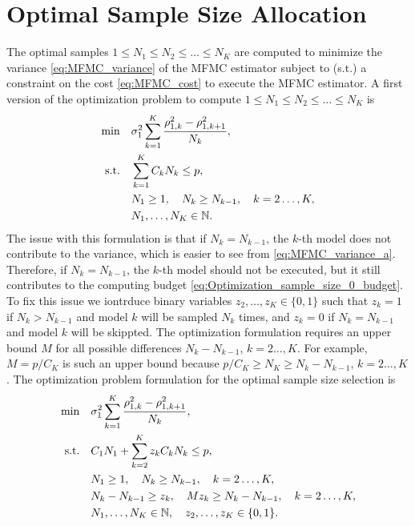 \section{Optimal Sample Size Allocation}\label{sec:MFMC_Nk_optimize}
The optimal samples $1 \le N_1 \le N_2 \le \ldots \le N_K$ are computed to minimize
the variance \eqref{eq:MFMC_variance} of the MFMC estimator
subject to (s.t.) a constraint on the cost \eqref{eq:MFMC_cost} to execute the MFMC estimator.
A first version of the optimization problem to compute $1 \le N_1 \le N_2 \le \ldots \le N_K$ is
\begin{subequations}\label{eq:Optimization_sample_size_N}
    \begin{align}
    \min \quad &\sigma_1^2  \sum_{k=1}^K \frac{ \rho_{1,k}^2 - \rho_{1,k+1}^2}{N_k},   \\
       \text{s.t.}\quad & \sum_{k=1}^K C_kN_k \le p,       \label{eq:Optimization_sample_size_N_budget}  \\
                                & N_1\ge 1,\quad  N_k \ge N_{k-1}, \quad k=2\ldots,K,\\
                                &N_1,\ldots, N_K\in \mathbb{N}.
    \end{align}
\end{subequations}
The issue with this formulation is that if $N_k = N_{k-1}$, the $k$-th model
does not contribute to the variance, which is easier to see from \eqref{eq:MFMC_variance_a}.
Therefore, if $N_k = N_{k-1}$, the $k$-th model should not be executed, but it still contributes to
the computing budget \eqref{eq:Optimization_sample_size_0_budget}.
To fix this issue we iontrduce binary variables $z_2, \ldots, z_K \in \{0,1\}$ such that
$z_k = 1$ if $N_k > N_{k-1}$ and model $k$ will be sampled $N_k$ times, and 
$z_k = 0$ if $N_k = N_{k-1}$ and model $k$ will be skippted.
The optimization formulation requires 
an upper bound $M$ for all possible differences $N_k - N_{k-1}$, $k=2\ldots,K$.
For example, $M = p/ C_K$ is such an upper bound because  $p/ C_K \ge N_K \ge N_k - N_{k-1}$, $k=2\ldots,K$.
The optimization problem formulation for the optimal sample size selection is
\begin{subequations}\label{eq:Optimization_sample_size_Nz}
    \begin{align}
    \min \quad &\sigma_1^2  \sum_{k=1}^K \frac{ \rho_{1,k}^2 - \rho_{1,k+1}^2}{N_k},   \\
       \text{s.t.}\quad &  C_1 N_1 + \sum_{k=2}^K z_k C_k N_k \le p,       \label{eq:Optimization_sample_size_Nz_budget}  \\
                                & N_1\ge 1,\quad  N_k \ge N_{k-1}, \quad k=2\ldots,K,\\
                                & N_k - N_{k-1} \ge z_k, \quad M z_k \ge N_k - N_{k-1},  \quad k=2\ldots,K,  \label{eq:Optimization_sample_size_Nz_z}  \\
                                &N_1,\ldots, N_K\in \mathbb{N}, \quad z_2 ,\ldots, z_K\in \{0,1\}.
    \end{align}
\end{subequations}
